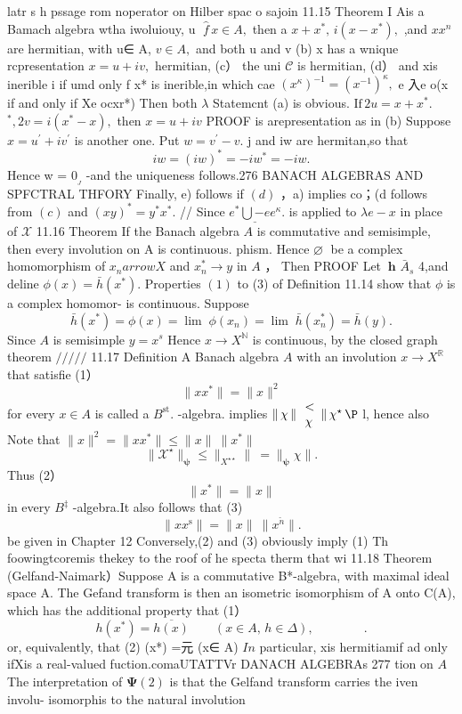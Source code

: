 latr s h pssage rom noperator on Hilber spac o sajoin 11.15 Theorem I Ais a Bamach algebra wtha iwoluiouy, u $\;{\hat{f}}\,x\in A,$ then a $x+x^{*},\,i(x-x^{*})\mathrm{,}$ ,and $x x^{n}$ are hermitian, with u∈ A, $v\in A,$ and both u and v (b) x has a wnique rcpresentation $x=u+i v,$ hermitian, (c） the uni $\scriptstyle{\mathcal{C}}$ is hermitian, (d） and xis inerible i if umd only f x* is inerible,in which cae $(x^{\kappa})^{-1}=(x^{-1})^{\kappa},$ e 入e o(x if and only if Xe ocxr*) Then both $\lambda$ Statemcnt (a) is obvious. ${\mathrm{If}}\,2u=x+x^{*}.$ ${}^{*},2v=i(x^{*}-x),$ then $x=u+i v$ PROOF is arepresentation as in (b) Suppose $x=u^{\prime}+i v^{\prime}$ is another one. Put $w=v^{\prime}-v.$ j and iw are hermitan,so that $$ i w=(i w)^{\ast}=-i w^{\ast}=-i w. $$ Hence w = $0_{\!_{J}}$ -and the uniqueness follows.276 BANACH ALGEBRAS AND SPFCTRAL THFORY Finally, e) follows if $(d)$ ，a) implies co；(d follows from $\left(c\right)$ and $(x y)^{*}=y^{*}x^{*}.$ // Since $e^{*}\underline{{\bigcup{-e}}}e^{\kappa}.$ is applied to $\lambda e-x$ in place of $\textstyle{\mathcal{X}}$ 11.16 Theorem If the Banach algebra $\textstyle A$ is commutative and semisimple, then every involution on A is continuous. phism. Hence $\varnothing\;$ be a complex homomorphism of $x_{n} arrow X$ and $x_{n}^{\ast}\to y$ in $\textstyle A$ ， Then PROOF Let $\ \boldsymbol{h}$ ${\bar{A}}_{s}$ 4,and deline $\phi(x)=\bar{h}(x^{\ast}).$ Properties $(1)$ to (3) of Definition 11.14 show that $\phi$ is a complex homomor- is continuous. Suppose $$ \bar{h}(x^{*})=\phi(x)=\operatorname*{lim}\;\phi(x_{n})=\operatorname*{lim}\;\bar{h}(x_{n}^{*})=\bar{h}(y). $$ Since $\textstyle A$ is semisimple $y=x^{s}$ Hence $x\to X^{\mathbb{N}}$ is continuous, by the closed graph theorem ${\Big/}{\Big/}{\Big/}{\Big/}{\Big/}$ 11.17 Definition A Banach algebra $\textstyle A$ with an involution $x\to X^{\mathbb{R}}$ that satisfie (1） $$ \|x x^{*}\|=\|x\|^{2} $$ for every $x\in A$ is called a $B^{\mathrm{st}}.$ -algebra. implies $\left\|\,\chi\,\right\|\begin{array}{l}{{<}}\\ {{\bf\chi}}\end{array} \|\,\chi^{\star}\,\P$ l, hence also Note that $\|x\|^{2}=\|x x^{*}\|\leq\|x\|\ \|x^{*}\|$ $$ \|{\mathcal{X}}^{\star}\|_{\mathbf{\psi}}\leq\|_{X^{\star\star}}\|\ =\|_{\mathbf{\psi}}\chi\|. $$ Thus (2） $$ \|x^{*}\|=\|x\| $$ in every $B^{\ddagger}$ -algebra.It also follows that (3) $$ \|x x^{\textrm{s}}\|=\|x\|\ \|x^{\check{n}}\|. $$ be given in Chapter 12 Conversely,(2) and (3) obviously imply (1) Th foowingtcoremis thekey to the roof of he specta therm that wi 11.18 Theorem (Gelfand-Naimark）Suppose A is a commutative B*-algebra, with maximal ideal space A. The Gefand transform is then an isometric isomorphism of A onto C(A), which has the additional property that (1） $$ h(x^{*})={\overline{{h(x)}}}\qquad(x\in A,\,h\in\Delta),\qquad\qquad. $$ or, equivalently, that (2) (x*) =元 (x∈ A) $\mathit{I\!n}$ particular, xis hermitiamif ad only ifXis a real-valued fuction.comaUTATTVr DANACH ALGEBRAs 277 tion on $\scriptstyle A$ The interpretation of $\mathbf{\Psi}(2)$ is that the Gelfand transform carries the iven involu- isomorphis to the natural involution 
